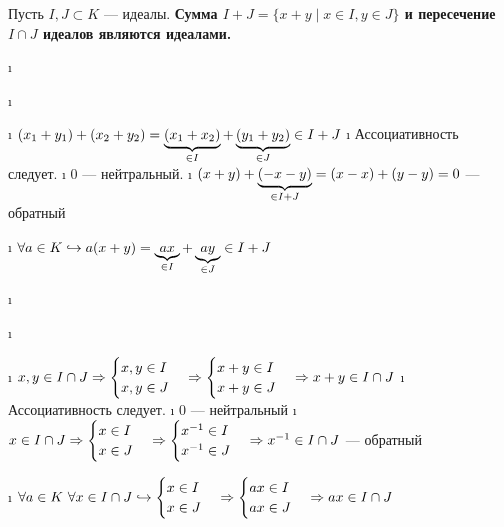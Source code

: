 \begin{problem}[16(3.12)]
Пусть $I,J \subset K$ --- идеалы. \bf{Сумма} $I+J = \{x+y \mid x \in I,y \in J\}$ и \bf{пересечение} $I \cap J$ идеалов являются идеалами. 
\end{problem}

\begin{solution}

\begin{enumerate}
\def\labelenumi{\alph{enumi})}
\i
  \begin{enumerate}
  \def\labelenumii{\arabic{enumii}.}
  \i
    \begin{itemize}
    \tightlist
    \i
      \((x_1+y_1)+(x_2+y_2) = \underbrace{(x_1+x_2)}_{\in I}+\underbrace{(y_1+y_2)}_{\in J} \in I+J\)
    \i
      Ассоциативность следует.
    \i
      0 --- нейтральный.
    \i
      \((x+y)+\underbrace{(-x-y)}_{\in I+J} = (x-x)+(y-y)=0\) --- обратный
    \end{itemize}
  \i
    \(\forall a \in K \hookrightarrow a(x+y)=\underbrace{ax}_{\in I}+\underbrace{ay}_{\in J} \in I+J\)
  \end{enumerate}
\i
  \begin{enumerate}
  \def\labelenumii{\arabic{enumii}.}
  \i
    \begin{itemize}
    \tightlist
    \i
      \(x, y \in I \cap J \Rightarrow \begin{cases} x, y \in I \\ x, y \in J \end{cases} \Rightarrow \begin{cases} x + y \in I \\ x + y \in J \end{cases} \Rightarrow x+y \in I\cap J\)
    \i
      Ассоциативность следует.
    \i
      0 --- нейтральный
    \i
      \(x \in I\cap J \Rightarrow \begin{cases} x \in I \\ x\in J \end{cases} \Rightarrow \begin{cases} x^{-1} \in I \\ x^{-1} \in J \end{cases} \Rightarrow x^{-1} \in I\cap J\) --- обратный
    \end{itemize}
  \i
    \(\forall a \in K\ \forall x \in I\cap J \hookrightarrow  \begin{cases} x\in I \\ x\in J \end{cases} \Rightarrow  \begin{cases} ax\in I \\ ax\in J \end{cases} \Rightarrow  ax \in I \cap J\)
  \end{enumerate}
\end{enumerate}

\end{solution}

